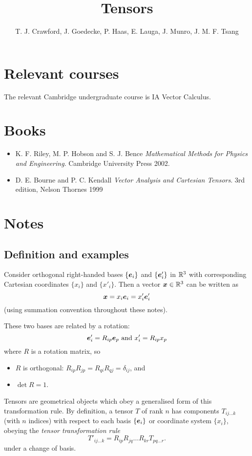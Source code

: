 \documentclass{article}
\title{Tensors}
\author{T. J. Crawford, J. Goedecke, P. Haas, E. Lauga, J. Munro, J. M. F. Tsang}
\begin{document}
\maketitle

\section{Relevant courses}

The relevant Cambridge undergraduate course is IA Vector Calculus. 

\section{Books}


\begin{itemize}
\item K. F. Riley, M. P. Hobson and S. J. Bence \textit{Mathematical Methods for
Physics and Engineering}. Cambridge University Press 2002.
\item D. E. Bourne and P. C. Kendall \textit{Vector Analysis and Cartesian Tensors}.
3rd edition, Nelson Thornes 1999
\end{itemize}

\section{Notes}

\subsection{Definition and examples}

Consider orthogonal right-handed bases $\{\boldsymbol{e}_i\}$ and $\{\boldsymbol{e}'_i\}$ in
$\mathbb{R}^3$ with corresponding Cartesian coordinates $\{x_i\}$ and $\{x'_i\}$.
Then a vector $\boldsymbol{x}\in\mathbb{R}^3$ can be written as
$$ \boldsymbol{x} = x_i\boldsymbol{e}_i = x'_i\boldsymbol{e}'_i $$
(using summation convention throughout these notes).

These two bases are related by a rotation: 
$$ \boldsymbol{e}'_i = R_{ip} \boldsymbol{e}_p \text{ and } x'_i = R_{ip} x_p $$
where $R$ is a rotation matrix, so
\begin{itemize}
\item $R$ is orthogonal: $R_{ip}R_{jp} = R_{qi}R_{qj} = \delta_{ij} $, and 
\item $\det R = 1$.
\end{itemize}

Tensors are geometrical objects which obey a generalised form of this
transformation rule. By definition, a tensor $T$ of rank $n$ has components
$T_{ij\dots k}$ (with $n$ indices) with respect to each basis $\{\boldsymbol{e}_i\}$
or coordinate system $\{x_i\}$, obeying the \textit{tensor
transformation rule}
$$ T'_{ij\dots k} = R_{ip}R_{jq}\dots R_{kr} T_{pq\dots r}. $$
under a change of basis.
\end{document}
